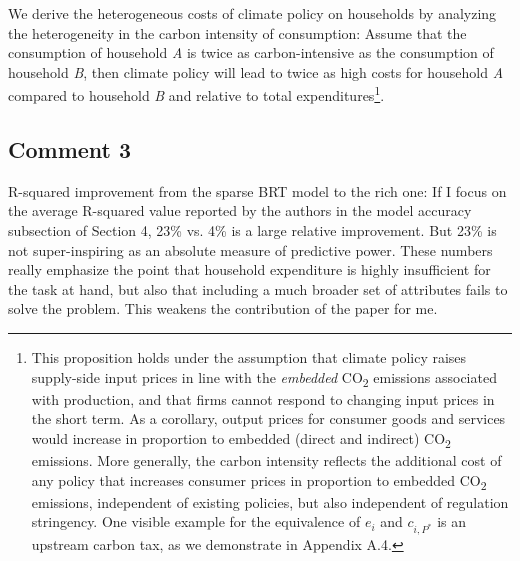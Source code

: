 \documentclass[11pt]{article}
\begin{document}
\begin{revisionbox}
    We derive the heterogeneous costs of climate policy on households by analyzing the heterogeneity in the carbon intensity of consumption: Assume that the consumption of household \textit{A} is twice as carbon-intensive as the consumption of household \textit{B}, then climate policy will lead to twice as high costs for household \textit{A} compared to household \textit{B} and relative to total expenditures\footnote{This proposition holds under the assumption that climate policy raises supply-side input prices in line with the \textit{embedded} CO\textsubscript{2} emissions associated with production, and that firms cannot respond to changing input prices in the short term. As a corollary, output prices for consumer goods and services would increase in proportion  to embedded (direct and indirect) CO\textsubscript{2} emissions. More generally, the carbon intensity reflects the additional cost of any policy that increases consumer prices in proportion to embedded CO\textsubscript{2} emissions, independent of existing policies, but also independent of regulation stringency. One visible example for the equivalence of $e_{i}$ and $c_{i,P^{\ast}}$ is an upstream carbon tax, as we demonstrate in Appendix A.4.}.
\end{revisionbox}


\subsection*{Comment 3}\label{comment_R1_3}

\begin{commentbox}
    R-squared improvement from the sparse BRT model to the rich one: If I focus on the average R-squared value reported by the authors in the model accuracy subsection of Section 4, 23\% vs. 4\% is a large relative improvement. But 23\% is not super-inspiring as an absolute measure of predictive power. These numbers really emphasize the point that household expenditure is highly insufficient for the task at hand, but also that including a much broader set of attributes fails to solve the problem. This weakens the contribution of the paper for me.
\end{commentbox}
\end{document}
